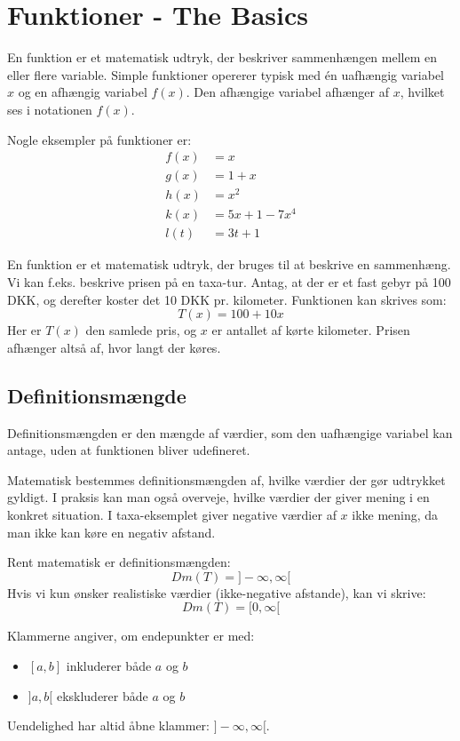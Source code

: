 \section{Funktioner - The Basics}
En funktion er et matematisk udtryk, der beskriver sammenhængen mellem en eller flere variable. Simple funktioner opererer typisk med én uafhængig variabel $x$ og en afhængig variabel $f(x)$. Den afhængige variabel afhænger af $x$, hvilket ses i notationen $f(x)$.

Nogle eksempler på funktioner er:
\begin{align*}
    f(x) &= x \\
    g(x) &= 1 + x \\
    h(x) &= x^2 \\
    k(x) &= 5x + 1 - 7x^4 \\
    l(t) &= 3t + 1
\end{align*}

En funktion er et matematisk udtryk, der bruges til at beskrive en sammenhæng. Vi kan f.eks. beskrive prisen på en taxa-tur. Antag, at der er et fast gebyr på 100 DKK, og derefter koster det 10 DKK pr. kilometer. Funktionen kan skrives som:
\begin{equation*}
    T(x) = 100 + 10x
\end{equation*}
Her er $T(x)$ den samlede pris, og $x$ er antallet af kørte kilometer. Prisen afhænger altså af, hvor langt der køres.

\subsection{Definitionsmængde}
Definitionsmængden er den mængde af værdier, som den uafhængige variabel kan antage, uden at funktionen bliver udefineret.

Matematisk bestemmes definitionsmængden af, hvilke værdier der gør udtrykket gyldigt. I praksis kan man også overveje, hvilke værdier der giver mening i en konkret situation. I taxa-eksemplet giver negative værdier af $x$ ikke mening, da man ikke kan køre en negativ afstand.

Rent matematisk er definitionsmængden:
\begin{equation*}
    Dm(T) = ]-\infty, \infty[
\end{equation*}
Hvis vi kun ønsker realistiske værdier (ikke-negative afstande), kan vi skrive:
\begin{equation*}
    Dm(T) = [0, \infty[
\end{equation*}

Klammerne angiver, om endepunkter er med:
\begin{itemize}
    \item $[a,b]$ inkluderer både $a$ og $b$
    \item $]a,b[$ ekskluderer både $a$ og $b$
\end{itemize}
Uendelighed har altid åbne klammer: $]-\infty, \infty[$.

